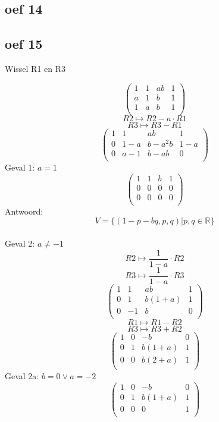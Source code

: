 \documentclass[10pt,a4paper]{article}
\begin{document}
\subsection*{oef 14}

\subsection*{oef 15}
\begin{center}
Wissel R1 en R3
\end{center}
\[
\begin{pmatrix}
1 & 1 & ab & 1\\
a & 1 & b & 1\\
1 & a & b & 1\\
\end{pmatrix}
\]
\[ R2 \longmapsto R2 - a\cdot R1 \]
\[ R3 \longmapsto R3 - R1 \]
\[
\begin{pmatrix}
1 & 1 & ab & 1\\
0 & 1-a & b-a^2b & 1-a\\
0 & a-1 & b-ab & 0\\
\end{pmatrix}
\]
Geval 1: $a=1$
\[
\begin{pmatrix}
1 & 1 & b & 1\\
0 & 0 & 0 & 0\\
0 & 0 & 0 & 0\\
\end{pmatrix}
\]
Antwoord:
\[
V = \{ (1-p-bq,p,q) | p,q \in \mathbb{R} \}
\]\\
Geval 2: $a \neq -1$
\[ R2 \longmapsto \frac{1}{1-a}\cdot R2 \]
\[ R3 \longmapsto \frac{1}{1-a}\cdot R3 \]
\[
\begin{pmatrix}
1 & 1 & ab & 1\\
0 & 1 & b(1+a) & 1\\
0 & -1 & b & 0\\
\end{pmatrix}
\]
\[ R1 \longmapsto R1 - R2 \]
\[ R3 \longmapsto R3 + R2 \]
\[
\begin{pmatrix}
1 & 0 & -b & 0\\
0 & 1 & b(1+a) & 1\\
0 & 0 & b(2+a) & 1\\
\end{pmatrix}
\]
Geval 2a: $b=0 \vee a=-2$
\[
\begin{pmatrix}
1 & 0 & -b & 0\\
0 & 1 & b(1+a) & 1\\
0 & 0 & 0 & 1\\
\end{pmatrix}
\]
\end{document}

